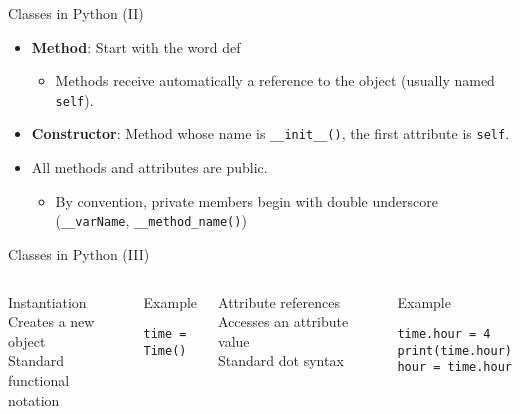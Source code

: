\documentclass[10pt,compress]{beamer} %
\begin{document}
\begin{frame}{Classes in Python (II)}
\begin{itemize}
	\item \textbf{Method}: Start with the word \alert{def}
   \begin{itemize}
   \item Methods receive automatically a reference to the object (usually named \texttt{self}).
   \end{itemize}
		\item \textbf{Constructor}: Method whose name is \texttt{\_\_init\_\_()}, the first attribute is \texttt{self}.

		\item All methods and attributes are public.
			\begin{itemize}
				\item By convention, private members begin with double underscore (\texttt{\_\_varName}, \texttt{\_\_method\_name()})
			\end{itemize}
\end{itemize}			
\end{frame}

\begin{frame}[fragile]{Classes in Python (III)}
    \begin{columns}
	   		\begin{block}{Instantiation}
			Creates a new object\\
			Standard functional notation\\
			\bigskip
			\\
	   		\end{block}
	   		\begin{exampleblock}{Example}
\begin{verbatim}
time = Time()
\end{verbatim}
	   		\end{exampleblock}
	   		\begin{block}{Attribute references}
			Accesses an attribute value\\
			Standard dot syntax\\
			\bigskip
			\\
	   		\end{block}
	   		\begin{exampleblock}{Example}
\begin{verbatim}
time.hour = 4
print(time.hour)
hour = time.hour
\end{verbatim}
	   		\end{exampleblock}

	\end{columns}
\end{frame}
\end{document}
